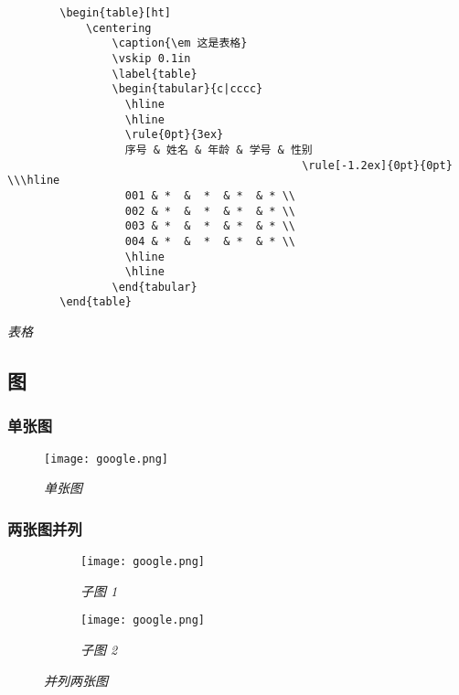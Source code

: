 \documentclass[a4paper, 12pt, UTF8]{ctexart}
\begin{document}
\begin{listing}[ht]
    \begin{verbatim}
        \begin{table}[ht]
            \centering
                \caption{\em 这是表格}
                \vskip 0.1in
                \label{table}
                \begin{tabular}{c|cccc}
                  \hline
                  \hline
                  \rule{0pt}{3ex}
                  序号 & 姓名 & 年龄 & 学号 & 性别  
                                             \rule[-1.2ex]{0pt}{0pt} \\\hline
                  001 & *  &  *  & *  & * \\ 
                  002 & *  &  *  & *  & * \\
                  003 & *  &  *  & *  & * \\      
                  004 & *  &  *  & *  & * \\
                  \hline
                  \hline 
                \end{tabular}
        \end{table}
    \end{verbatim}
    \caption{\em 表格}
    \label{table}
\end{listing}

\clearpage
\subsection{图}

\subsubsection{单张图}
\begin{figure}[H]
    \centering \texttt{[image: google.png]}
    \caption{\em 单张图}
    \label{fig:mesh}
\end{figure}

\subsubsection{两张图并列}
\begin{figure}[H]
    \centering
    \begin{subfigure}{.48\textwidth}
        \centering
        \texttt{[image: google.png]}
        \caption{\em 子图 1}
        \label{fig:v21}
    \end{subfigure}
    \begin{subfigure}{.48\textwidth}
        \centering
        \texttt{[image: google.png]}
        \caption{\em 子图 2}
        \label{fig:v22}
    \end{subfigure}
    \caption{\em 并列两张图}
    \label{fig:v2}
\end{figure}
\end{document}
